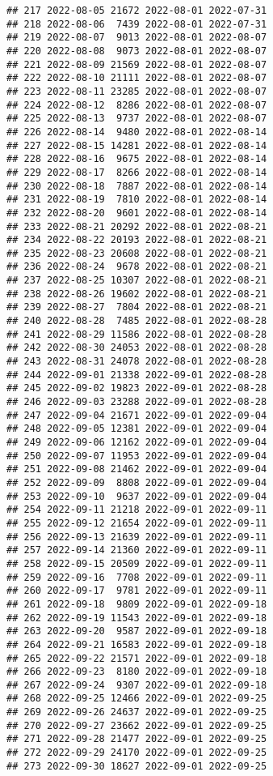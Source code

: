 \documentclass[
]{article}
\begin{document}
\begin{verbatim}
## 217 2022-08-05 21672 2022-08-01 2022-07-31
## 218 2022-08-06  7439 2022-08-01 2022-07-31
## 219 2022-08-07  9013 2022-08-01 2022-08-07
## 220 2022-08-08  9073 2022-08-01 2022-08-07
## 221 2022-08-09 21569 2022-08-01 2022-08-07
## 222 2022-08-10 21111 2022-08-01 2022-08-07
## 223 2022-08-11 23285 2022-08-01 2022-08-07
## 224 2022-08-12  8286 2022-08-01 2022-08-07
## 225 2022-08-13  9737 2022-08-01 2022-08-07
## 226 2022-08-14  9480 2022-08-01 2022-08-14
## 227 2022-08-15 14281 2022-08-01 2022-08-14
## 228 2022-08-16  9675 2022-08-01 2022-08-14
## 229 2022-08-17  8266 2022-08-01 2022-08-14
## 230 2022-08-18  7887 2022-08-01 2022-08-14
## 231 2022-08-19  7810 2022-08-01 2022-08-14
## 232 2022-08-20  9601 2022-08-01 2022-08-14
## 233 2022-08-21 20292 2022-08-01 2022-08-21
## 234 2022-08-22 20193 2022-08-01 2022-08-21
## 235 2022-08-23 20608 2022-08-01 2022-08-21
## 236 2022-08-24  9678 2022-08-01 2022-08-21
## 237 2022-08-25 10307 2022-08-01 2022-08-21
## 238 2022-08-26 19602 2022-08-01 2022-08-21
## 239 2022-08-27  7804 2022-08-01 2022-08-21
## 240 2022-08-28  7485 2022-08-01 2022-08-28
## 241 2022-08-29 11586 2022-08-01 2022-08-28
## 242 2022-08-30 24053 2022-08-01 2022-08-28
## 243 2022-08-31 24078 2022-08-01 2022-08-28
## 244 2022-09-01 21338 2022-09-01 2022-08-28
## 245 2022-09-02 19823 2022-09-01 2022-08-28
## 246 2022-09-03 23288 2022-09-01 2022-08-28
## 247 2022-09-04 21671 2022-09-01 2022-09-04
## 248 2022-09-05 12381 2022-09-01 2022-09-04
## 249 2022-09-06 12162 2022-09-01 2022-09-04
## 250 2022-09-07 11953 2022-09-01 2022-09-04
## 251 2022-09-08 21462 2022-09-01 2022-09-04
## 252 2022-09-09  8808 2022-09-01 2022-09-04
## 253 2022-09-10  9637 2022-09-01 2022-09-04
## 254 2022-09-11 21218 2022-09-01 2022-09-11
## 255 2022-09-12 21654 2022-09-01 2022-09-11
## 256 2022-09-13 21639 2022-09-01 2022-09-11
## 257 2022-09-14 21360 2022-09-01 2022-09-11
## 258 2022-09-15 20509 2022-09-01 2022-09-11
## 259 2022-09-16  7708 2022-09-01 2022-09-11
## 260 2022-09-17  9781 2022-09-01 2022-09-11
## 261 2022-09-18  9809 2022-09-01 2022-09-18
## 262 2022-09-19 11543 2022-09-01 2022-09-18
## 263 2022-09-20  9587 2022-09-01 2022-09-18
## 264 2022-09-21 16583 2022-09-01 2022-09-18
## 265 2022-09-22 21571 2022-09-01 2022-09-18
## 266 2022-09-23  8180 2022-09-01 2022-09-18
## 267 2022-09-24  9307 2022-09-01 2022-09-18
## 268 2022-09-25 12466 2022-09-01 2022-09-25
## 269 2022-09-26 24637 2022-09-01 2022-09-25
## 270 2022-09-27 23662 2022-09-01 2022-09-25
## 271 2022-09-28 21477 2022-09-01 2022-09-25
## 272 2022-09-29 24170 2022-09-01 2022-09-25
## 273 2022-09-30 18627 2022-09-01 2022-09-25

\end{verbatim}
\end{document}
